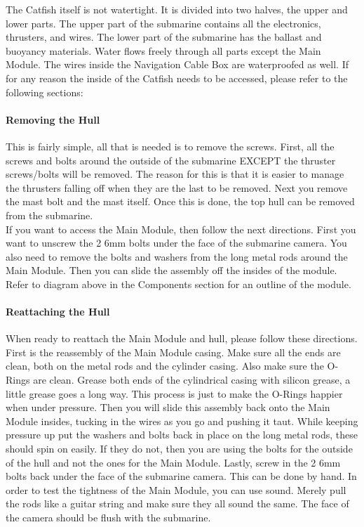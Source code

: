 \documentclass[
10pt, %
a4paper, %
oneside, %
headinclude,footinclude, %
BCOR5mm, %
]{scrartcl}
\begin{document}
The Catfish itself is not watertight. It is divided into two halves, the upper and lower parts. The upper part of the submarine contains all the electronics, thrusters, and wires. The lower part of the submarine has the ballast and buoyancy materials. Water flows freely through all parts except the Main Module. The wires inside the Navigation Cable Box are waterproofed as well. If for any reason the inside of the Catfish needs to be accessed, please refer to the following sections: 

\paragraph{Removing the Hull} This is fairly simple, all that is needed is to remove the screws. First, all the screws and bolts around the outside of the submarine EXCEPT the thruster screws/bolts will be removed. The reason for this is that it is easier to manage the thrusters falling off when they are the last to be removed. Next you remove the mast bolt and the mast itself. Once this is done, the top hull can be removed from the submarine. \\

If you want to access the Main Module, then follow the next directions. First you want to unscrew the 2 6mm bolts under the face of the submarine camera. You also need to remove the bolts and washers from the long metal rods around the Main Module. Then you can slide the assembly off the insides of the module. Refer to diagram above in the Components section for an outline of the module.
\paragraph{Reattaching the Hull} When ready to reattach the Main Module and hull, please follow these directions. \\

First is the reassembly of the Main Module casing. Make sure all the ends are clean, both on the metal rods and the cylinder casing. Also make sure the O-Rings are clean. Grease both ends of the cylindrical casing with silicon grease, a little grease goes a long way. This process is just to make the O-Rings happier when under pressure. Then you will slide this assembly back onto the Main Module insides, tucking in the wires as you go and pushing it taut. While keeping pressure up put the washers and bolts back in place on the long metal rods, these should spin on easily. If they do not, then you are using the bolts for the outside of the hull and not the ones for the Main Module. Lastly, screw in the 2 6mm bolts back under the face of the submarine camera. This can be done by hand. In order to test the tightness of the Main Module, you can use sound. Merely pull the rods like a guitar string and make sure they all sound the same. The face of the camera should be flush with the submarine.\\
\end{document}
